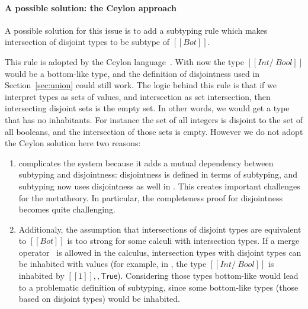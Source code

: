 \paragraph{A possible solution: the Ceylon approach}
A possible solution for this issue is to add a subtyping rule which makes intersection of
disjoint types to be subtype of $[[Bot]]$.

\begin{center}
\end{center}

\noindent This rule is adopted by the Ceylon language~\cite{muehlboeck2018empowering}. With 
now the type $[[Int /\ Bool]]$ would be a bottom-like type, and the
definition of disjointness used in Section~\ref{sec:union} could still work.
The logic behind this rule is that if we interpret types as sets of values,
and intersection as set intersection, then intersecting disjoint sets
is the empty set. In other words, we would get a type that has no inhabitants.
For instance the set of all integers is disjoint to the set of all booleans,
and the intersection of those sets is empty.
However we do not adopt the Ceylon solution here two reasons:

\begin{enumerate}

\item {} complicates the system because
  it adds a mutual dependency between subtyping and disjointness:
  disjointness is defined in terms of subtyping, and subtyping now
  uses disjointness as well in . This creates important
  challenges for the metatheory. In particular, the completeness proof
  for disjointness becomes quite challenging.

\item Additionaly, the assumption that intersections of disjoint types
  are equivalent to $[[Bot]]$ is too strong for some calculi with intersection
  types. If a merge operator~\cite{reynolds1988preliminary} is allowed in the calculus, 
  intersection types
  with disjoint types can be inhabited with values (for example, in 
  \cite{oliveira2016disjoint},
  the type $[[Int /\ Bool]]$ is inhabited by $[[1]] ,, \mathsf{True}$). Considering those
  types bottom-like would lead to a problematic definition of
  subtyping, since some bottom-like types (those based on disjoint types) would
  be inhabited.

\end{enumerate}

